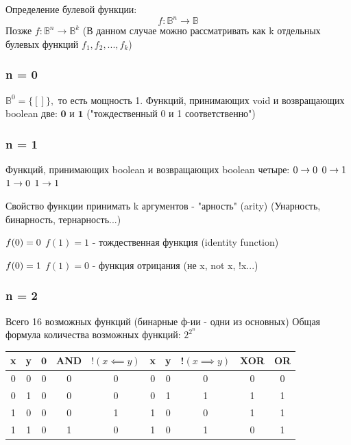 \documentclass{article}
\begin{document}
Определение булевой функции:
\[ f: \mathbb{B}^{n} \longrightarrow \mathbb{B}\]
Позже \( f: \mathbb{B}^{n} \longrightarrow \mathbb{B}^{k}\)
(В данном случае можно рассматривать как k отдельных булевых функций $f_1, f_2, ..., f_k$)

\subsubsection{n = 0}
$ \mathbb{B}^{0} = \{[]\}, $ то есть мощность 1.
Функций, принимающих void и возвращающих boolean две: $\mathbf{0}$ и $\mathbf{1}$ ("тождественный 0 и 1 соответственно") %

\subsubsection{n = 1}
Функций, принимающих boolean и возвращающих boolean четыре: \newline
$0 \rightarrow 0 \newline$
$0 \rightarrow 1 \newline$
$1 \rightarrow 0 \newline$
$1 \rightarrow 1 \newline$

Свойство функции принимать k аргументов - "арность" (arity)
(Унарность, бинарность, тернарность...)

$f(0) = 0 \newline$
$f(1) = 1$ - тождественная функция (identity function)

$f(0) = 1 \newline$
$f(1) = 0$ - функция отрицания (не x, not x, !x...)

\subsubsection{n = 2}
Всего 16 возможных функций (бинарные ф-ии - одни из основных)
Общая формула количества возможных функций: $ 2^{2^{n}}$

\begin{table}
    \centering
    \begin{tabular}{ |c|c|c|c|c|c|c|c|c|c| }
        \hline
         x & y & $\mathbf{0}$ & AND & $!(x \impliedby y)$ & x & y & !$(x \implies y)$ & XOR & OR \\
         \hline
         0 & 0 & 0 & 0 & 0 & 0 & 0 & 0 & 0 & 0 \\
         0 & 1 & 0 & 0 & 0 & 0 & 1 & 1 & 1 & 1 \\
         1 & 0 & 0 & 0 & 1 & 1 & 0 & 0 & 1 & 1 \\
         1 & 1 & 0 & 1 & 0 & 1 & 0 & 1 & 0 & 1 \\
         \hline
    \end{tabular}
    \label{tab:my_label}
\end{table}
\end{document}
